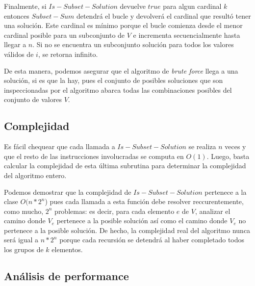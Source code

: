 Finalmente, si $Is-Subset-Solution$ devuelve $true$ para algun cardinal $k$ entonces $Subset-Sum$ detendrá el bucle y devolverá el cardinal que resultó tener una solución. Este cardinal es mínimo porque el bucle comienza desde el menor cardinal posible para un subconjunto de $V$ e incrementa secuencialmente hasta llegar a $n$. Si no se encuentra un subconjunto solución para todos los valores válidos de $i$, se retorna infinito.

\vskip 8pt

De esta manera, podemos asegurar que el algoritmo de \textit{brute force} llega a una solución, si es que la hay, pues el conjunto de posibles soluciones que son inspeccionadas por el algoritmo abarca todas las combinaciones posibles del conjunto de valores $V$.

\subsection{Complejidad}
Es fácil chequear que cada llamada a $Is-Subset-Solution$ se realiza $n$ veces y que el resto de las instrucciones involucradas se computa en $O(1)$. Luego, basta calcular la complejidad de esta última subrutina para determinar la complejidad del algoritmo entero.

\vskip 8pt

Podemos demostrar que la complejidad de $Is-Subset-Solution$ pertenece a la clase $O(n*2^{n}$) pues cada llamada a esta función debe resolver reccurentemente, como mucho, $2^{n}$ problemas: es decir, para cada elemento $e$ de $V$, analizar el camino donde $V_{e}$ pertenece a la posible solución así como el camino donde $V_{e}$ no pertenece a la posible solución. De hecho, la complejidad real del algoritmo nunca será igual a $n*2^{n}$ porque cada recursión se detendrá al haber completado todos los grupos de $k$ elementos.

\subsection{Análisis de performance}